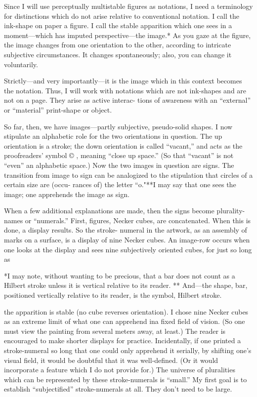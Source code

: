 Since I will use perceptually multistable figures as notations, I 
need a terminology for distinctions which do not arise relative to 
conventional notation. I call the ink-shape on paper a figure. I call the 
stable apparition which one sees in a moment—which has imputed 
perspective—the image.* As you gaze at the figure, the image changes 
from one orientation to the other, according to intricate subjective 
circumstances. It changes spontaneously; also, you can change it 
voluntarily. 

Strictly—and very importantly—it is the image which in this 
context becomes the notation. Thus, I will work with notations which 
are not ink-shapes and are not on a page. They arise as active interac- 
tions of awareness with an “external” or “material” print-shape or 
object. 

So far, then, we have images—partly subjective, pseudo-solid 
shapes. I now stipulate an alphabetic role for the two orientations in 
question. The up orientation is a stroke; the down orientation is called 
“vacant,” and acts as the proofreaders’ symbol © , meaning “close up 
space.” (So that “vacant” is not “even” an alphabetic space.) Now the 
two images in question are signs. The transition from image to sign can 
be analogized to the stipulation that circles of a certain size are (occu- 
rances of) the letter “o."**I may say that one sees the image; one 
apprehends the image as sign. 

When a few additional explanations are made, then the signs 
become plurality-names or “numerals.” First, figures, Necker cubes, 
are concatenated. When this is done, a display results. So the stroke- 
numeral in the artwork, as an assembly of marks on a surface, is a 
display of nine Necker cubes. An image-row occurs when one looks at 
the display and sees nine subjectively oriented cubes, for just so long as 


*I may note, without wanting to be precious, that a bar does not count as 
a Hilbert stroke unless it is vertical relative to its reader. 
** And—the shape, bar, positioned vertically relative to its reader, is the 
symbol, Hilbert stroke. 


the apparition is stable (no cube reverses orientation). I chose nine 
Necker cubes as an extreme limit of what one can apprehend ina fixed 
field of vision. (So one must view the painting from several meters 
away, at least.) The reader is encouraged to make shorter displays for 
practice. Incidentally, if one printed a stroke-numeral so long that one 
could only apprehend it serially, by shifting one’s visual field, it would 
be doubtful that it was well-defined. (Or it would incorporate a feature 
which I do not provide for.) The universe of pluralities which can be 
represented by these stroke-numerals is “small.” My first goal is to 
establish “subjectified” stroke-numerals at all. They don’t need to be 
large. 

